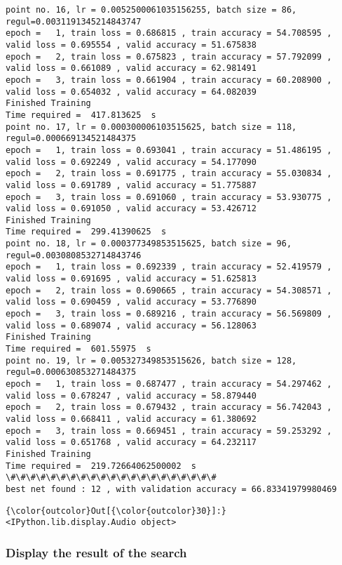 \documentclass[11pt]{article}
\begin{document}
\begin{Verbatim}[commandchars=\\\{\}]
point no. 16, lr = 0.0052500061035156255, batch size = 86, regul=0.0031191345214843747
epoch =   1, train loss = 0.686815 , train accuracy = 54.708595 , valid loss = 0.695554 , valid accuracy = 51.675838
epoch =   2, train loss = 0.675823 , train accuracy = 57.792099 , valid loss = 0.661089 , valid accuracy = 62.981491
epoch =   3, train loss = 0.661904 , train accuracy = 60.208900 , valid loss = 0.654032 , valid accuracy = 64.082039
Finished Training
Time required =  417.813625  s 
point no. 17, lr = 0.000300006103515625, batch size = 118, regul=0.000669134521484375
epoch =   1, train loss = 0.693041 , train accuracy = 51.486195 , valid loss = 0.692249 , valid accuracy = 54.177090
epoch =   2, train loss = 0.691775 , train accuracy = 55.030834 , valid loss = 0.691789 , valid accuracy = 51.775887
epoch =   3, train loss = 0.691060 , train accuracy = 53.930775 , valid loss = 0.691050 , valid accuracy = 53.426712
Finished Training
Time required =  299.41390625  s 
point no. 18, lr = 0.000377349853515625, batch size = 96, regul=0.0030808532714843746
epoch =   1, train loss = 0.692339 , train accuracy = 52.419579 , valid loss = 0.691695 , valid accuracy = 51.625813
epoch =   2, train loss = 0.690665 , train accuracy = 54.308571 , valid loss = 0.690459 , valid accuracy = 53.776890
epoch =   3, train loss = 0.689216 , train accuracy = 56.569809 , valid loss = 0.689074 , valid accuracy = 56.128063
Finished Training
Time required =  601.55975  s 
point no. 19, lr = 0.005327349853515626, batch size = 128, regul=0.000630853271484375
epoch =   1, train loss = 0.687477 , train accuracy = 54.297462 , valid loss = 0.678247 , valid accuracy = 58.879440
epoch =   2, train loss = 0.679432 , train accuracy = 56.742043 , valid loss = 0.668411 , valid accuracy = 61.380692
epoch =   3, train loss = 0.669451 , train accuracy = 59.253292 , valid loss = 0.651768 , valid accuracy = 64.232117
Finished Training
Time required =  219.72664062500002  s 
\#\#\#\#\#\#\#\#\#\#\#\#\#\#\#\#\#\#\#\#\#
best net found : 12 , with validation accuracy = 66.83341979980469

    \end{Verbatim}

\begin{Verbatim}[commandchars=\\\{\}]
{\color{outcolor}Out[{\color{outcolor}30}]:} <IPython.lib.display.Audio object>
\end{Verbatim}
            
    \subsubsection{Display the result of the
search}\label{display-the-result-of-the-search}
\end{document}
